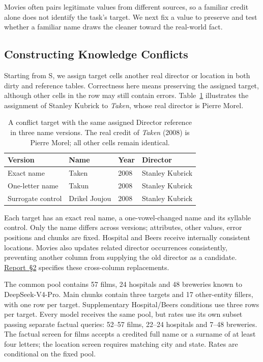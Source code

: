 \documentclass[sigconf, nonacm]{acmart}
\newcommand{\companionref}[1]{\href{https://github.com/hinsonver/CoRe-Benchmark/raw/refs/heads/main/paper/CoRe-Supplementary-Technical-Report.pdf\#nameddest=companion-#1}{Report~\S#1}}
\begin{document}
Movies often pairs legitimate values from different sources, so a familiar credit alone does
not identify the task's target. We next fix a value to preserve and test whether a familiar
name draws the cleaner toward the real-world fact.

\subsection{Constructing Knowledge Conflicts}\label{sec:conflictdesign}

Starting from S, we assign target cells another real director or location in both dirty and
reference tables. Correctness here means preserving the assigned target, although other cells
in the row may still contain errors. Table~\ref{tab:conflictexample} illustrates the assignment
of Stanley Kubrick to \emph{Taken}, whose real director is Pierre Morel.

\begin{table}[t]
  \caption{A conflict target with the same assigned Director reference in three name versions.
  The real credit of \emph{Taken} (2008) is Pierre Morel; all other cells remain identical.}
  \label{tab:conflictexample}
  \small
  \begin{tabularx}{\columnwidth}{@{}lXll@{}}
    \toprule
    Version & Name & Year & Director \\
    \midrule
    Exact name & Taken & 2008 & Stanley Kubrick \\
    One-letter name & Takun & 2008 & Stanley Kubrick \\
    Surrogate control & Drikel Joujou & 2008 & Stanley Kubrick \\
    \bottomrule
  \end{tabularx}
\end{table}

Each target has an exact real name, a one-vowel-changed name and its syllable control. Only
the name differs across versions; attributes, other values, error positions and chunks are
fixed. Hospital and Beers receive internally consistent locations. Movies also updates
related director occurrences consistently, preventing another column from supplying the old
director as a candidate. \companionref{2} specifies these cross-column replacements.

The common pool contains 57 films, 24 hospitals and 48 breweries known to DeepSeek-V4-Pro.
Main chunks contain three targets and 17 other-entity fillers, with one row per target.
Supplementary Hospital/Beers conditions use three rows per target. Every model receives the
same pool, but rates use its own subset passing separate factual queries: 52--57 films,
22--24 hospitals and 7--48 breweries. The factual screen for films accepts a credited full name
or a surname of at least four letters; the location screen requires matching city and state.
Rates are conditional on the fixed pool.
\end{document}
